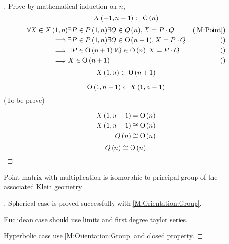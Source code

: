 \documentclass[stu, babel, american, biblatex, a4paper, leqno, draftall]{apa7}
\begin{document}
\begin{proof}[]
    Prove by mathematical induction on $n$,
    \begin{equation}
        X\left(+1, n-1\right)\subset\operatorname{O}\left(n\right)
    \end{equation}
    \begin{align*}
    	\forall{X \in X\left(1, n\right)} 
    	&
    	\exists{P \in P\left(1, n\right)}
    	\exists{Q \in Q\left(n\right)},
    	X = P\cdot Q & \text{(\cref{M:Point})} \\
    	\implies
    	&
    	\exists{P \in P\left(1, n\right)}
    	\exists{Q \in \ortho\left(n+1\right)},
    	X = P\cdot Q & \text{()} \\
    	\implies
    	&
    	\exists{P \in \ortho\left(n+1\right)}
    	\exists{Q \in \ortho\left(n\right)},
    	X = P\cdot Q & \text{()} \\
    	\implies
    	&
    	X \in \ortho\left(n+1\right) & \text{()}
    \end{align*}
   	\begin{equation*}
   		X\left(1, n\right) \subset \operatorname{O}\left(n+1\right)
   	\end{equation*}
   	
   	\begin{equation}
        \operatorname{O}\left(1, n-1\right) \subset X\left(1, n-1\right)
    \end{equation}
    (To be prove)
   	
   	\begin{align*}
   		X\left(1, n-1\right) &= \operatorname{O}\left(n\right) \\
   		X\left(1, n-1\right) &\cong \operatorname{O}\left(n\right) \\
   		Q\left(n\right) &\cong \operatorname{O}\left(n\right)
   	\end{align*}
   	\begin{equation*}
   		Q\left(n\right) \cong \operatorname{O}\left(n\right) \qedhere
   	\end{equation*}
\end{proof}
\begin{lemma}\label{M:Point:Group}
    Point matrix with multiplication
    is isomorphic to principal group of the associated Klein geometry.
\end{lemma}
\begin{proof}[]
    \skipped

    Spherical case is proved successfully with \cref{M:Orientation:Group}.

    Euclidean case should use limits and first degree taylor series.

    Hyperbolic case use \cref{M:Orientation:Group} and closed property.
\end{proof}
\end{document}
